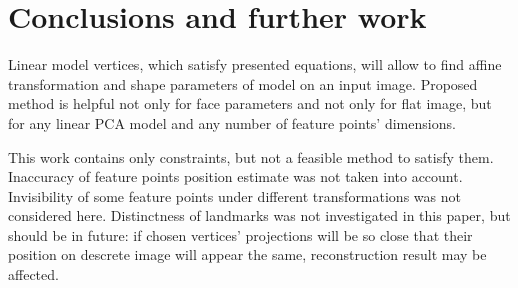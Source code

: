 \section{Conclusions and further work}

Linear model vertices, which satisfy presented equations,
will allow to find affine transformation and shape parameters
of model on an input image.
Proposed method is helpful not only for face parameters
and not only for flat image,
but for any linear PCA model and any number of feature points' dimensions.

This work contains only constraints,
but not a feasible method to satisfy them.
Inaccuracy of feature points position estimate
was not taken into account.
Invisibility of some feature points under different transformations
was not considered here.
Distinctness of landmarks was not investigated in this paper,
but should be in future:
if chosen vertices' projections will be so close
that their position on descrete image will appear the same,
reconstruction result may be affected.

